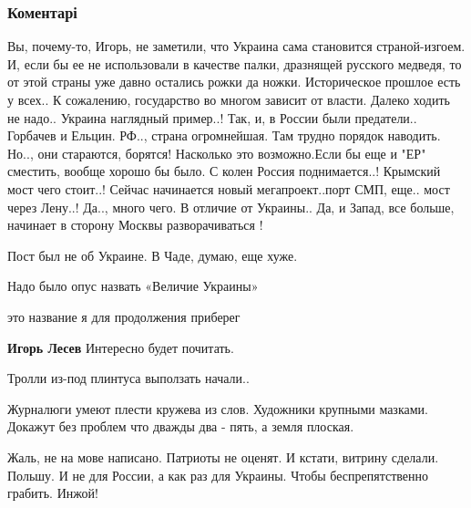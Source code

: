  
 
 
 
 
\subsubsection{Коментарі}
\label{sec:26_12_2019.fb.lesev_igor.1.padenie_rossii.cmt}

\begin{itemize} %

Вы, почему-то, Игорь, не заметили, что Украина сама становится страной-изгоем.
И, если бы ее не использовали в качестве палки, дразнящей русского медведя, то
от этой страны уже давно остались рожки да ножки. Историческое прошлое есть у
всех.. К сожалению, государство во многом зависит от власти. Далеко ходить не
надо.. Украина наглядный пример..! Так, и, в России были предатели.. Горбачев и
Ельцин. РФ.., страна огромнейшая. Там трудно порядок наводить. Но.., они
стараются, борятся! Насколько это возможно.Если бы еще и "ЕР" сместить, вообще
хорошо бы было. С колен Россия поднимается..! Крымский мост чего стоит..!
Сейчас начинается новый мегапроект..порт СМП, еще.. мост через Лену..! Да..,
много чего. В отличие от Украины.. Да, и Запад, все больше, начинает в сторону
Москвы разворачиваться !


Пост был не об Украине. В Чаде, думаю, еще хуже.

Надо было опус назвать «Величие Украины»

это название я для продолжения приберег

\textbf{Игорь Лесев} Интересно будет почитать.

Тролли из-под плинтуса выползать начали..

Журналюги умеют плести кружева из слов. Художники крупными мазками. Докажут без проблем что дважды два - пять, а земля плоская.


Жаль, не на мове написано. Патриоты не оценят. И кстати, витрину сделали.
Польшу. И не для России, а как раз для Украины. Чтобы беспрепятственно грабить.
Инжой!


\end{itemize}
